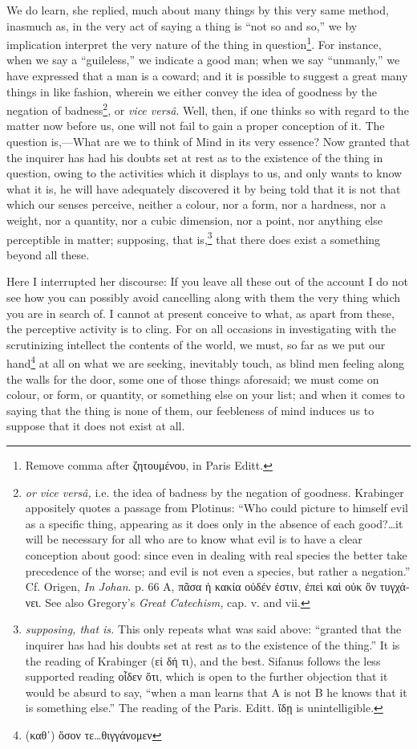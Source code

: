 We do learn, she replied, much about many things by this very same method, inasmuch as, in the very act of saying a thing is “not so and so,” we by implication interpret the very nature of the thing in question\footnote{Remove comma after \textgreek{ζητουμένου}, in Paris Editt.}. For instance, when we say a “guileless,” we indicate a good man; when we say “unmanly,” we have expressed that a man is a coward; and it is possible to suggest a great many things in like fashion, wherein we either convey the idea of goodness by the negation of badness\footnote{\emph{or vice versâ,} i.e. the idea of badness by the negation of goodness. Krabinger appositely quotes a passage from Plotinus: “Who could picture to himself evil as a specific thing, appearing as it does only in the absence of each good?…it will be necessary for all who are to know what evil is to have a clear conception about good: since even in dealing with real species the better take precedence of the worse; and evil is not even a species, but rather a negation.” Cf. Origen, \emph{In Johan}. p. 66 A, \textgreek{πᾶσα ἡ κακία οὐδέν ἐστιν, ἐπεὶ καὶ οὐκ ὂν τυγχάνει}. See also Gregory’s \emph{Great Catechism,} cap. v. and vii.}, or \emph{vice versâ}. Well, then, if one thinks so with regard to the matter now before us, one will not fail to gain a proper conception of it. The question is,—What are we to think of Mind in its very essence? Now granted that the inquirer has had his doubts set at rest as to the existence of the thing in question, owing to the activities which it displays to us, and only wants to know what it is, he will have adequately discovered it by being told that it is not that which our senses perceive, neither a colour, nor a form, nor a hardness, nor a weight, nor a quantity, nor a cubic dimension, nor a point, nor anything else perceptible in matter; supposing, that is,\footnote{\emph{supposing, that is.} This only repeats what was said above: “granted that the inquirer has had his doubts set at rest as to the existence of the thing.” It is the reading of Krabinger (\textgreek{εἰ δή τι}), and the best. Sifanus follows the less supported reading \textgreek{οἶδεν ὅτι}, which is open to the further objection that it would be absurd to say, “when a man learns that A is not B he knows that it is something else.” The reading of the Paris. Editt. \textgreek{ἴδῃ} is unintelligible.} that there does exist a something beyond all these.

Here I interrupted her discourse: If you leave all these out of the account I do not see how you can possibly avoid cancelling along with them the very thing which you are in search of. I cannot at present conceive to what, as apart from these, the perceptive activity is to cling. For on all occasions in investigating with the scrutinizing intellect the contents of the world, we must, so far as we put our hand\footnote{(\textgreek{καθ᾽) ὅσον τε}…\textgreek{θιγγάνομεν}} at all on what we are seeking, inevitably touch, as blind men feeling along the walls for the door, some one of those things aforesaid; we must come on colour, or form, or quantity, or something else on your list; and when it comes to saying that the thing is none of them, our feebleness of mind induces us to suppose that it does not exist at all.

